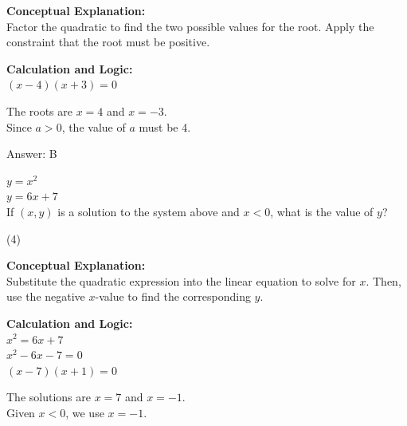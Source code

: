 \documentclass[11pt,paper=a4,answers]{exam}
\begin{document}
\begin{questions}
\begin{solution}
\textbf{Conceptual Explanation:} \\
Factor the quadratic to find the two possible values for the root. Apply the constraint that the root must be positive.

\vspace{20pt}

\textbf{Calculation and Logic:} \\
$(x - 4)(x + 3) = 0$

\vspace{10pt}

The roots are $x = 4$ and $x = -3$. \\
Since $a > 0$, the value of $a$ must be 4.

\vspace{25pt}

Answer: \colorbox{yellow!100}{B}
\end{solution}

\vspace{40pt}

\question
$y = x^2$ \\
$y = 6x + 7$ \\
If $(x, y)$ is a solution to the system above and $x < 0$, what is the value of $y$?
\begin{tasks}(4)
\end{tasks}

\begin{solution}
\textbf{Conceptual Explanation:} \\
Substitute the quadratic expression into the linear equation to solve for $x$. Then, use the negative $x$-value to find the corresponding $y$.

\vspace{20pt}

\textbf{Calculation and Logic:} \\
$x^2 = 6x + 7$ \\
$x^2 - 6x - 7 = 0$ \\
$(x - 7)(x + 1) = 0$

\vspace{10pt}

The solutions are $x = 7$ and $x = -1$. \\
Given $x < 0$, we use $x = -1$.

\vspace{10pt}


\end{solution}
\end{questions}
\end{document}
